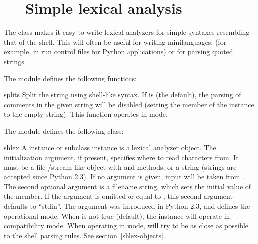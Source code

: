 \section{ ---
         Simple lexical analysis}



The  class makes it easy to write lexical analyzers for
simple syntaxes resembling that of the \UNIX{} shell.  This will often
be useful for writing minilanguages, (for example, in run control
files for Python applications) or for parsing quoted strings.


The  module defines the following functions:

\begin{funcdesc}{split}{s}
Split the string  using shell-like syntax. If  is
 (the default), the parsing of comments in the given
string will be disabled (setting the  member of the
 instance to the empty string).  This function operates
in \POSIX{} mode.
\end{funcdesc}

The  module defines the following class:

\begin{classdesc}{shlex}{}
A  instance or subclass instance is a lexical analyzer
object.  The initialization argument, if present, specifies where to
read characters from. It must be a file-/stream-like object with
 and  methods, or a string (strings
are accepted since Python 2.3). If no argument is given, input will be
taken from .  The second optional argument is a filename
string, which sets the initial value of the  member.  If
the  argument is omitted or equal to ,
this second argument defaults to ``stdin''.  The  argument
was introduced in Python 2.3, and defines the operational mode.  When
 is not true (default), the  instance will
operate in compatibility mode.  When operating in \POSIX{} mode,
 will try to be as close as possible to the \POSIX{} shell
parsing rules.  See section~\ref{shlex-objects}.
\end{classdesc}


